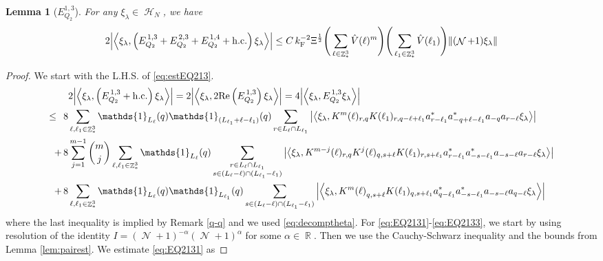 \documentclass[12pt,a4paper]{article}
\numberwithin{equation}{section}
\newcommand{\1}{\mathbb{I}}
\newcommand{\F}{\mathrm{F}}
\DeclareMathOperator{\R}{\mathbb{R}}
\DeclareMathOperator{\Z}{\mathbb{Z}}
\DeclareMathOperator{\HH}{\mathcal{H}}
\DeclareMathOperator{\NN}{\mathcal{N}}
\newcommand{\half}{\frac{1}{2}}
\newcommand{\eva}[1]{\left\langle #1 \right\rangle}
\theoremstyle{plain}
\newtheorem{lemma}[theorem]{Lemma}
\theoremstyle{definition}
\theoremstyle{remark}
\theoremstyle{plain}
\theoremstyle{definition}
\theoremstyle{remark}
\begin{document}
\begin{lemma}[$E_{Q_2}^{1,3}$]\label{lem:EQ213}
For any $\xi_\lambda \in \HH_N$, we have
\begin{equation}
	2\abs{\eva{\xi_\lambda,\left(E^{\,1,3}_{Q_2}+E^{\,2,3}_{Q_2}+E^{\,1,4}_{Q_2}+\mathrm{h.c.}\right) \xi_\lambda }} 
	\leq  C\, k_{\F}^{-2} \Xi^{\half} \Bigg(\sum\limits_{\ell \in \Z^3_*} \hat{V}(\ell)^m \Bigg) \Bigg( \sum\limits_{\ell_1 \in \Z^3_*}\hat{V}(\ell_1) \Bigg)  \norm { (\NN+1) \xi_\lambda }    \label{eq:estEQ213}
\end{equation}
\end{lemma}
\begin{proof}
We start with the L.H.S. of \eqref{eq:estEQ213}.
\begin{align}
	&2\abs{\eva{\xi_\lambda,\left(E^{\,1,3}_{Q_2}+\mathrm{h.c.}\right) \xi_\lambda }} = 2\abs{\eva{\xi_\lambda,2\mathrm{Re}\left(E^{\,1,3}_{Q_2}\right) \xi_\lambda }} = 4\abs{\eva{\xi_\lambda, E^{\,1,3}_{Q_2} \xi_\lambda }}\nonumber\\
    \leq\,\;8& \sum\limits_{\ell, \ell_1\in \Z^3_*} \mathds{1}_{L_{\ell}}(q) \mathds{1}_{(L_{\ell_1}+\ell-\ell_1)}(q) \sum\limits_{r\in L_{\ell} \cap L_{\ell_1}} \abs{\eva{\xi_\lambda, K^m(\ell)_{r,q}K(\ell_1)_{r,q-\ell+\ell_1}a^*_{r-\ell_1}a^*_{-q+\ell-\ell_1} a_{-q}a_{r-\ell} \xi_\lambda }}\label{eq:EQ2131}\\
    +\,8& \sum\limits_{j=1}^{m-1} {{m}\choose j} \sum\limits_{\ell, \ell_1\in \Z^3_*}\mathds{1}_{L_{\ell}}(q) \sum\limits_{\substack{r\in L_{\ell} \cap L_{\ell_1}\\ s \in (L_{\ell}-\ell) \cap (L_{\ell_1}-\ell_1)}}  \abs{\eva{\xi_\lambda, K^{m-j}(\ell)_{r,q} K^{j}(\ell)_{q,s+\ell} K(\ell_1)_{r,s+\ell_1}a^*_{r-\ell_1}a^*_{-s-\ell_1} a_{-s-\ell}a_{r-\ell}  \xi_\lambda }}\label{eq:EQ2132}\\
    +\,8&\sum\limits_{\ell, \ell_1\in \Z^3_*} \mathds{1}_{L_{\ell}}(q) \mathds{1}_{L_{\ell_1}}(q) \sum\limits_{ s \in (L_{\ell}-\ell) \cap (L_{\ell_1}-\ell_1)} \abs{\eva{\xi_\lambda, K^m{(\ell)}_{q,s+\ell} K(\ell_1)_{q,s+\ell_1} a^*_{q-\ell_1} a^*_{-s-\ell_1} a_{-s-\ell} a_{q-\ell} \xi_\lambda }}\label{eq:EQ2133}
\end{align}
where the last inequality is implied by Remark \ref{q-q} and we used \eqref{eq:decomptheta}.
For \eqref{eq:EQ2131}-\eqref{eq:EQ2133}, we start by using resolution of the identity $I = (\NN+1)^{-\alpha}(\NN+1)^{\alpha}$ for some $\alpha \in \R$. Then we use the Cauchy-Schwarz inequality and the bounds from Lemma \ref{lem:pairest}.
We estimate \eqref{eq:EQ2131} as

\end{proof}
\end{document}
